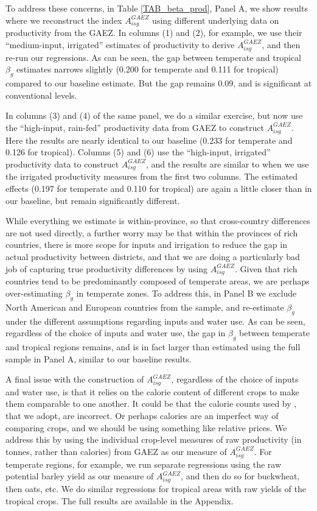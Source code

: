 \documentclass[11pt]{article}
\begin{document}
To address these concerns, in Table \ref{TAB_beta_prod}, Panel A, we show results where we reconstruct the index $A_{isg}^{GAEZ}$ using different underlying data on productivity from the GAEZ. In columns (1) and (2), for example, we use their ``medium-input, irrigated'' estimates of productivity to derive $A_{isg}^{GAEZ}$, and then re-run our regressions. As can be seen, the gap between temperate and tropical $\beta_g$ estimates narrows slightly (0.200 for temperate and 0.111 for tropical) compared to our baseline estimate. But the gap remains 0.09, and is significant at conventional levels.

In columns (3) and (4) of the same panel, we do a similar exercise, but now use the ``high-input, rain-fed'' productivity data from GAEZ to construct $A_{isg}^{GAEZ}$. Here the results are nearly identical to our baseline (0.233 for temperate and 0.126 for tropical). Columns (5) and (6) use the ``high-input, irrigated'' productivity data to construct $A_{isg}^{GAEZ}$, and the results are similar to when we use the irrigated productivity measures from the first two columns. The estimated effects (0.197 for temperate and 0.110 for tropical) are again a little closer than in our baseline, but remain significantly different.

While everything we estimate is within-province, so that cross-country differences are not used directly, a further worry may be that within the provinces of rich countries, there is more scope for inputs and irrigation to reduce the gap in actual productivity between districts, and that we are doing a particularly bad job of capturing true productivity differences by using $A_{isg}^{GAEZ}$. Given that rich countries tend to be predominantly composed of temperate areas, we are perhaps over-estimating $\beta_g$ in temperate zones. To address this, in Panel B we exclude North American and European countries from the sample, and re-estimate $\beta_g$ under the different assumptions regarding inputs and water use. As can be seen, regardless of the choice of inputs and water use, the gap in $\beta_g$ between temperate and tropical regions remains, and is in fact larger than estimated using the full sample in Panel A, similar to our baseline results.

A final issue with the construction of $A^{GAEZ}_{isg}$, regardless of the choice of inputs and water use, is that it relies on the calorie content of different crops to make them comparable to one another. It could be that the calorie counts used by \cite{galorozak2016}, that we adopt, are incorrect. Or perhaps calories are an imperfect way of comparing crops, and we should be using something like relative prices. We address this by using the individual crop-level measures of raw productivity (in tonnes, rather than calories) from GAEZ as our measure of $A^{GAEZ}_{isg}$. For temperate regions, for example, we run separate regressions using the raw potential barley yield as our measure of $A^{GAEZ}_{isg}$, and then do so for buckwheat, then oats, etc. We do similar regressions for tropical areas with raw yields of the tropical crops. The full results are available in the Appendix. 
\end{document}
